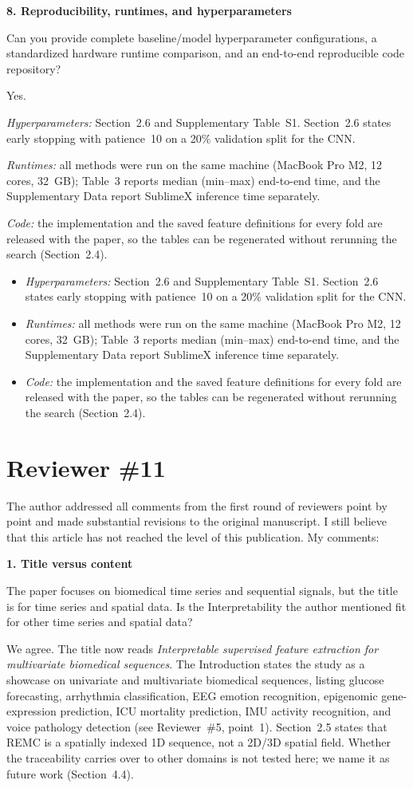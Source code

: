 \documentclass[11pt]{article}
\makeatletter
\newcommand{\rsp}{\par\vspace{0.9em}}
\newcommand{\rc}[1]{\begin{reviewerbox}#1\end{reviewerbox}}
\newcommand{\rcitem}[2]{\begin{reviewerbox}\textbf{#1}\par\smallskip#2\end{reviewerbox}}
\newcommand{\response}[2]{%
  \begin{responsebox}#1%
  \def\@responseitems{#2}%
  \ifx\@responseitems\empty\else\begin{itemize}[nosep,leftmargin=1.2em]#2\end{itemize}\fi
  \end{responsebox}\rsp}
\makeatother
\begin{document}
\rcitem{8. Reproducibility, runtimes, and hyperparameters}{Can you provide complete baseline/model
hyperparameter configurations, a standardized hardware runtime comparison, and an end-to-end
reproducible code repository?}

\response{Yes.}{
  \item \emph{Hyperparameters:} Section~2.6 and Supplementary Table~S1. Section~2.6 states early
    stopping with patience~10 on a 20\% validation split for the CNN.
  \item \emph{Runtimes:} all methods were run on the same machine (MacBook Pro M2, 12 cores, 32~GB);
    Table~3 reports median (min--max) end-to-end time, and the Supplementary Data report SublimeX
    inference time separately.
  \item \emph{Code:} the implementation and the saved feature definitions for every fold are
    released with the paper, so the tables can be regenerated without rerunning the search
    (Section~2.4).
}

\section*{Reviewer \#11}

\rc{The author addressed all comments from the first round of reviewers point by point and made
substantial revisions to the original manuscript. I still believe that this article has not reached
the level of this publication. My comments:}

\rcitem{1. Title versus content}{The paper focuses on biomedical time series and sequential signals,
but the title is for time series and spatial data. Is the Interpretability the author mentioned fit
for other time series and spatial data?}

\response{We agree. The title now reads \emph{Interpretable supervised feature extraction for
multivariate biomedical sequences}. The Introduction states the study as a showcase on univariate and
multivariate biomedical sequences, listing glucose forecasting, arrhythmia classification, EEG emotion
recognition, epigenomic gene-expression prediction, ICU mortality prediction, IMU activity recognition,
and voice pathology detection (see Reviewer~\#5, point~1). Section~2.5 states that REMC is a spatially
indexed 1D sequence, not a 2D/3D spatial field. Whether the traceability carries over to other domains
is not tested here; we name it as future work (Section~4.4).}{}
\end{document}
